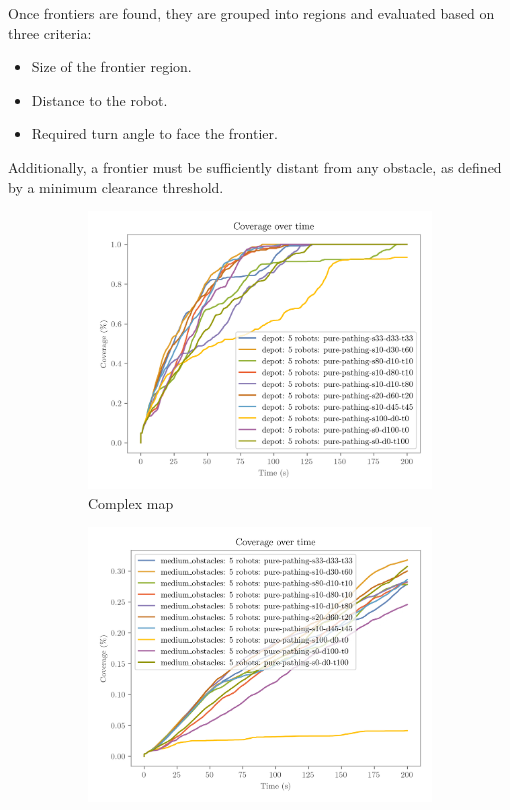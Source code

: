 Once frontiers are found, they are grouped into regions and evaluated based on three criteria:
\begin{itemize}
  \item Size of the frontier region.
  \item Distance to the robot.
  \item Required turn angle to face the frontier.
\end{itemize}
Additionally, a frontier must be sufficiently distant from any obstacle, as defined by a minimum clearance threshold.

\begin{figure}[H]
    \centering
    \begin{subfigure}[b]{0.45\textwidth}
        \centering
        \includegraphics[width=\textwidth]{figures/frontier_eval_params_depot.png}
        \caption{Complex map}
    \end{subfigure}
    \begin{subfigure}[b]{0.45\textwidth}
        \centering
        \includegraphics[width=\textwidth]{figures/frontier_eval_params_medium_obstacles.png}

\end{subfigure}
\end{figure}
